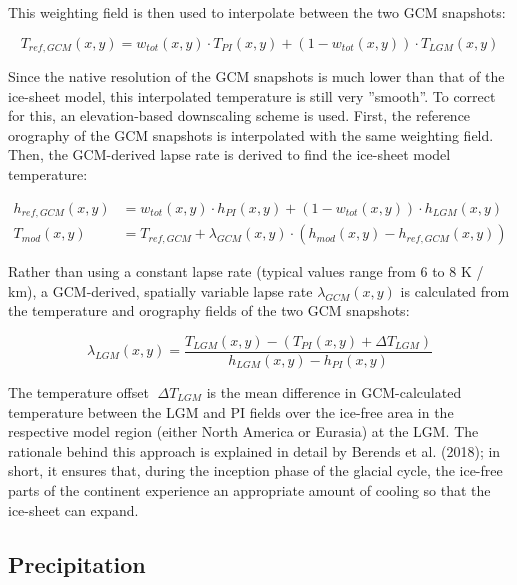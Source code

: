 \documentclass{article}
\begin{document}
This weighting field is then used to interpolate between the two GCM snapshots:

\begin{equation}
T_{ref,GCM}(x,y) = w_{tot} (x,y) \cdot T_{PI} (x,y) + \left( 1 - w_{tot} (x,y) \right) \cdot T_{LGM} (x,y)
\end{equation}

Since the native resolution of the GCM snapshots is much lower than that of the ice-sheet model, this interpolated temperature is still very ''smooth''. To correct for this, an elevation-based downscaling scheme is used. First, the reference orography of the GCM snapshots is interpolated with the same weighting field. Then, the GCM-derived lapse rate is derived to find the ice-sheet model temperature:

\begin{align}
h_{ref,GCM}(x,y) &= w_{tot} (x,y) \cdot h_{PI} (x,y) + \left( 1 - w_{tot} (x,y) \right) \cdot h_{LGM} (x,y)\\
T_{mod} (x,y) &= T_{ref,GCM} + \lambda_{GCM} (x,y) \cdot \left( h_{mod} (x,y) - h_{ref,GCM} (x,y) \right)
\end{align}

Rather than using a constant lapse rate (typical values range from 6 to 8 K / km), a GCM-derived, spatially variable lapse rate $\lambda_{GCM} (x,y)$ is calculated from the temperature and orography fields of the two GCM snapshots:

\begin{equation}
\lambda_{LGM} (x,y) = \frac{T_{LGM}(x,y) - \left( T_{PI} (x,y) + \Delta T_{LGM} \right) }{h_{LGM} (x,y) - h_{PI} (x,y)}
\end{equation}

The temperature offset $􏰀\Delta T_{LGM}$ is the mean difference in GCM-calculated temperature between the LGM and PI fields over the ice-free area in the respective model region (either North America or Eurasia) at the LGM. The rationale behind this approach is explained in detail by Berends et al. (2018); in short, it ensures that, during the inception phase of the glacial cycle, the ice-free parts of the continent experience an appropriate amount of cooling so that the ice-sheet can expand.\\

\subsection{Precipitation}
\end{document}
